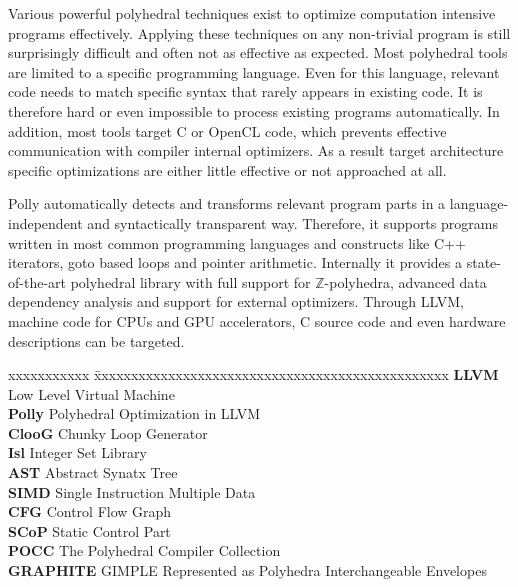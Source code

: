\documentclass[MTech]{iitmdiss}
\begin{document}
Various powerful polyhedral techniques exist to optimize
computation intensive programs effectively.  Applying these techniques on any
non-trivial
program is still surprisingly difficult and often not as effective as expected.
Most polyhedral tools are limited to a specific programming language.  Even for
this language, relevant code needs to match specific syntax that rarely
appears in existing code.  It is therefore hard or even impossible to
process existing programs automatically.  In addition, most tools target C or
OpenCL code, which prevents effective communication with compiler internal
optimizers. As a result target architecture specific optimizations are
either little effective or not approached at all.

 Polly automatically detects and transforms relevant program parts in a
language-independent and syntactically transparent way. Therefore, it supports
programs written in most common programming languages and constructs
like C++ iterators, goto based loops and pointer arithmetic.  Internally it
provides a state-of-the-art polyhedral library with full support for
$\mathbb{Z}$-polyhedra, advanced data dependency analysis and
support for external optimizers. Through LLVM, machine code for CPUs and GPU accelerators,
C source code and even hardware descriptions can be targeted.


\pagebreak


\begin{singlespace}
\tableofcontents
\thispagestyle{empty}

\listoffigures
{}
\end{singlespace}


\abbreviations
 
\noindent 
\begin{tabbing}
xxxxxxxxxxx \= xxxxxxxxxxxxxxxxxxxxxxxxxxxxxxxxxxxxxxxxxxxxxxxx \kill
\textbf{LLVM}   \> Low Level Virtual Machine \\
\textbf{Polly} \> Polyhedral Optimization in LLVM \\
\textbf{ClooG} \>  Chunky Loop Generator \\
\textbf{Isl} \>  Integer Set Library \\
\textbf{AST} \>  Abstract Synatx Tree \\
\textbf{SIMD} \> Single Instruction Multiple Data  \\
\textbf{CFG} \>  Control Flow Graph  \\
\textbf{SCoP} \> Static Control Part  \\
\textbf{POCC} \> The Polyhedral Compiler Collection  \\
\textbf{GRAPHITE} \> GIMPLE Represented as Polyhedra Interchangeable Envelopes   \\
\textbf{} \>   \\
\end{tabbing}
\end{document}

